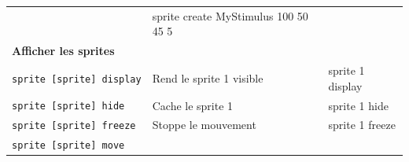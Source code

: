 \documentclass[
]{book}
\begin{document}
\begin{longtable}[]{@{}lll@{}}
\begin{minipage}[t]{0.25\columnwidth}
\end{minipage} & \begin{minipage}[t]{0.25\columnwidth}\raggedright
sprite create MyStimulus 100 50 45 5\strut
\end{minipage}\tabularnewline
\begin{minipage}[t]{0.40\columnwidth}\raggedright
\textbf{Afficher les sprites}\strut
\end{minipage} & \begin{minipage}[t]{0.25\columnwidth}\raggedright
\strut
\end{minipage} & \begin{minipage}[t]{0.25\columnwidth}\raggedright
\strut
\end{minipage}\tabularnewline
\begin{minipage}[t]{0.40\columnwidth}\raggedright
\texttt{sprite\ {[}sprite{]}\ display}\strut
\end{minipage} & \begin{minipage}[t]{0.25\columnwidth}\raggedright
Rend le sprite 1 visible\strut
\end{minipage} & \begin{minipage}[t]{0.25\columnwidth}\raggedright
sprite 1 display\strut
\end{minipage}\tabularnewline
\begin{minipage}[t]{0.40\columnwidth}\raggedright
\texttt{sprite\ {[}sprite{]}\ hide}\strut
\end{minipage} & \begin{minipage}[t]{0.25\columnwidth}\raggedright
Cache le sprite 1\strut
\end{minipage} & \begin{minipage}[t]{0.25\columnwidth}\raggedright
sprite 1 hide\strut
\end{minipage}\tabularnewline
\begin{minipage}[t]{0.40\columnwidth}\raggedright
\texttt{sprite\ {[}sprite{]}\ freeze}\strut
\end{minipage} & \begin{minipage}[t]{0.25\columnwidth}\raggedright
Stoppe le mouvement\strut
\end{minipage} & \begin{minipage}[t]{0.25\columnwidth}\raggedright
sprite 1 freeze\strut
\end{minipage}\tabularnewline
\begin{minipage}[t]{0.40\columnwidth}\raggedright
\texttt{sprite\ {[}sprite{]}\ move}\strut
\end{minipage} & \begin{minipage}[t]{0.25\columnwidth}\raggedright

\end{minipage}
\end{longtable}
\end{document}
